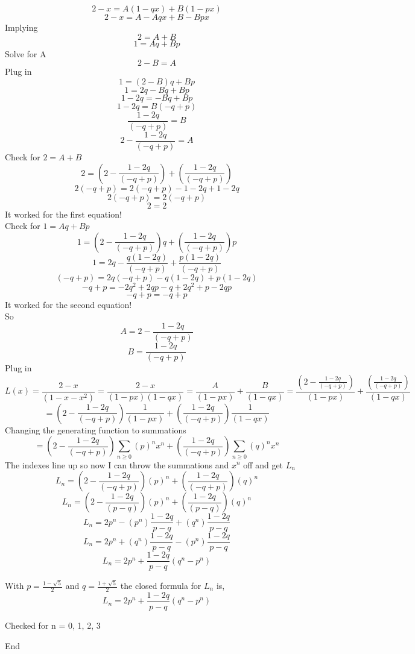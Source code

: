 \documentclass[10pt, AMS Euler]{article}
\begin{document}
\begin{enumerate}
                $$ 2 - x = A(1-qx) + B(1-px) $$
                $$ 2 - x = A-Aqx + B-Bpx $$
                Implying
                $$ 2 = A + B $$
                $$ 1 = Aq + Bp $$
                Solve for A
                $$ 2 - B = A $$
                Plug in 
                $$ 1 = (2 - B)q + Bp $$
                $$ 1 = 2q - Bq + Bp $$
                $$ 1 - 2q = - Bq + Bp $$
                $$ 1 - 2q = B (-q + p) $$
                $$ \frac{1 - 2q}{(-q + p)} = B  $$
                $$ 2 - \frac{1 - 2q}{(-q + p)} = A $$
                Check for $ 2 = A + B $
                $$ 2 = (2 - \frac{1 - 2q}{(-q + p)}) + (\frac{1 - 2q}{(-q + p)})$$
                $$ 2 (-q + p) = 2(-q + p) - 1 - 2q + 1 - 2q$$
                $$ 2 (-q + p) = 2(-q + p)$$
                $$ 2 = 2$$
                It worked for the first equation! \\
                Check for $ 1 = Aq + Bp $
                $$ 1 = (2 - \frac{1 - 2q}{(-q + p)})q + (\frac{1 - 2q}{(-q + p)})p $$
                $$ 1 = 2q - \frac{q(1 - 2q)}{(-q + p)} + \frac{p(1 - 2q)}{(-q + p)} $$
                $$ (-q + p) = 2q(-q + p) - q(1 - 2q) + p(1 - 2q) $$
                $$ -q + p = -2q^2 + 2qp - q + 2q^2 + p - 2qp $$
                $$ -q + p = - q + p $$
                It worked for the second equation! \\
                So
                $$ A = 2 - \frac{1 - 2q}{(-q + p)} $$
                $$ B = \frac{1 - 2q}{(-q + p)}  $$
                Plug in
                $$ $$
                $$ L(x) = \frac{2-x}{( 1 - x - x^2 )}= \frac{2-x}{(1-px)(1-qx)} = \frac{A}{(1-px)} + \frac{B}{(1-qx)} = \frac{(2 - \frac{1 - 2q}{(-q + p)})}{(1-px)} + \frac{(\frac{1 - 2q}{(-q + p)})}{(1-qx)}$$
                $$ = (2 - \frac{1 - 2q}{(-q + p)})\frac{1}{(1-px)} + (\frac{1 - 2q}{(-q + p)})\frac{1}{(1-qx)} $$
                Changing the generating function to summations
                $$ = (2 - \frac{1 - 2q}{(-q + p)}) \sum_{n\geq0} (p)^n x^n + (\frac{1 - 2q}{(-q + p)})  \sum_{n\geq0} (q)^n x^n $$
                The indexes line up so now I can throw the summations and $x^n$ off and get $L_n$
                $$ L_n = (2 - \frac{1 - 2q}{(-q + p)}) (p)^n + (\frac{1 - 2q}{(-q + p)}) (q)^n $$
                $$ L_n = (2 - \frac{1 - 2q}{(p-q)}) (p)^n + (\frac{1 - 2q}{(p-q)}) (q)^n $$
                $$ L_n = 2p^n - (p^n)\frac{1 - 2q}{p-q}  + (q^n)\frac{1 - 2q}{p-q} $$ 
                $$ L_n = 2p^n + (q^n)\frac{1 - 2q}{p-q} - (p^n)\frac{1 - 2q}{p-q} $$ 
                $$ L_n = 2p^n + \frac{1 - 2q}{p-q} (q^n - p^n) $$ 

                With $p = \frac{1-\sqrt{5}}{2}$ and $q = \frac{1+\sqrt{5}}{2}$ the closed formula for $L_n$ is,
                $$ L_n = 2p^n + \frac{1 - 2q}{p-q} (q^n - p^n) $$ 
                
                Checked for n = 0, 1, 2, 3
                
                End
        
	\end{enumerate}
\end{document}

